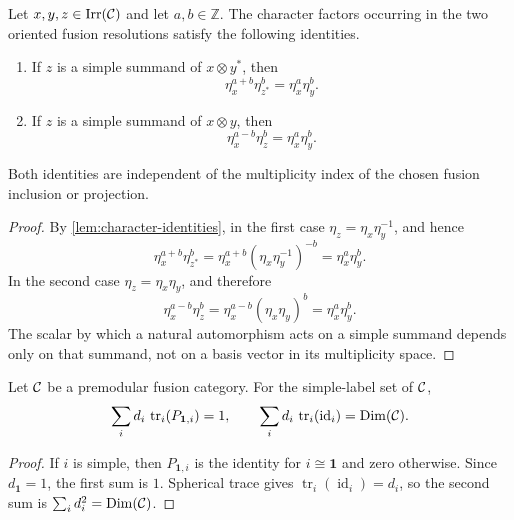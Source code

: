 \begin{lemma}
\label{lem:two-over-two-character-factors}
Let \(x,y,z\in\operatorname{Irr}(\mathcal{C})\) and let \(a,b\in\mathbb Z\).
The character factors occurring in the two oriented fusion resolutions
satisfy the following identities.
\begin{enumerate}[label=(\roman*),ref=\roman*]
  \item If \(z\) is a simple summand of \(x\otimes y^*\), then
  \[
    \eta_x^{a+b}\eta_{z^*}^{b}
    =\eta_x^a\eta_y^b.
  \]

  \item If \(z\) is a simple summand of \(x\otimes y\), then
  \[
    \eta_x^{a-b}\eta_z^{b}
    =\eta_x^a\eta_y^b.
  \]
\end{enumerate}
Both identities are independent of the multiplicity index of the chosen
fusion inclusion or projection.
\end{lemma}

\begin{proof}
By \cref{lem:character-identities}, in the first case
\(\eta_z=\eta_x\eta_y^{-1}\), and hence
\[
  \eta_x^{a+b}\eta_{z^*}^{b}
  =\eta_x^{a+b}(\eta_x\eta_y^{-1})^{-b}
  =\eta_x^a\eta_y^b.
\]
In the second case \(\eta_z=\eta_x\eta_y\), and therefore
\[
  \eta_x^{a-b}\eta_z^b
  =\eta_x^{a-b}(\eta_x\eta_y)^b
  =\eta_x^a\eta_y^b.
\]
The scalar by which a natural automorphism acts on a simple summand depends
only on that summand, not on a basis vector in its multiplicity space.
\end{proof}

\begin{lemma}
\label{lem:local-cancellation-sums}
Let \(\mathcal{C}\) be a premodular fusion category.
For the simple-label set of $\mathcal{C}$,
\begin{equation}
  \sum_i d_i\,\operatorname{tr}_i(P_{\mathbf1,i})=1,
  \qquad
  \sum_i d_i\,\operatorname{tr}_i(\operatorname{id}_i)
  =\operatorname{Dim}(\mathcal{C}).
  \label{eq:local-cancellation-sums}
\end{equation}
\end{lemma}

\begin{proof}
If $i$ is simple, then $P_{\mathbf1,i}$ is the identity for
$i\cong\mathbf1$ and zero otherwise.  Since $d_{\mathbf1}=1$, the first sum
is $1$.  Spherical trace gives
$\operatorname{tr}_i(\operatorname{id}_i)=d_i$, so the second sum is
$\sum_i d_i^2=\operatorname{Dim}(\mathcal{C})$.
\end{proof}
